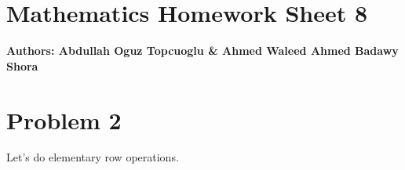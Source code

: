 \documentclass{article}
\begin{document}
\section*{\huge Mathematics Homework Sheet 8}
\begin{flushright}
   \textbf{Authors: Abdullah Oguz Topcuoglu \& Ahmed Waleed Ahmed Badawy Shora}
\end{flushright}


\section*{Problem 2}
Let's do elementary row operations.
\end{document}
